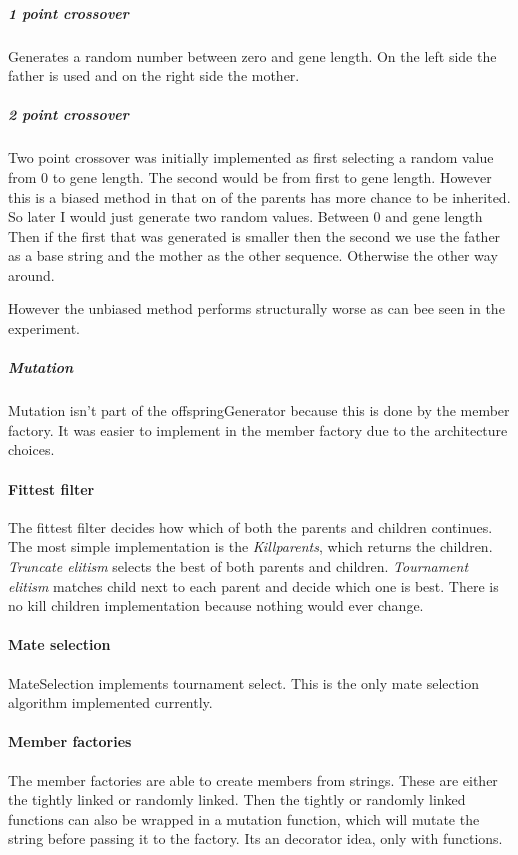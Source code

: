 \documentclass{article}
\begin{document}
\begin{empfile}
\subparagraph{1 point crossover}
Generates a random number between zero and gene length. On the left side 
the father is used and on the right side the mother.

\subparagraph{2 point crossover}
Two point crossover was initially implemented
as first selecting a random value from 0 to gene length. The second would
be from first to gene length. However this is a biased method in that
on of the parents has more chance to be inherited. So
later I would just generate two random values. Between 0 and gene length
Then if the first that was generated is smaller then the second we use
the father as a base string and the mother as the other sequence. Otherwise
the other way around.

However the unbiased method performs structurally worse as can bee seen
in the experiment.

\subparagraph{Mutation}
Mutation isn't part of the offspringGenerator
because this is done by the member factory. It was easier to implement
in the member factory due to the architecture choices.

\paragraph{Fittest filter} The fittest filter decides how which of both
the parents and children continues.
The most simple implementation is the \emph{Killparents}, which
returns the children. \emph{Truncate elitism} selects the best of both parents
and children. \emph{Tournament elitism} matches child next to each parent
and decide which one is best. There is no kill children implementation
because nothing would ever change.

\paragraph{Mate selection} MateSelection implements tournament select.
This is the only mate selection algorithm implemented currently.

\paragraph{Member factories} The member factories are able to create
members from strings. These are either the tightly linked or randomly
linked. Then the tightly or randomly linked
functions can also be wrapped in a mutation function,
which will mutate the string before passing it to the factory.
Its an decorator idea, only with functions.


\end{empfile}
\end{document}
